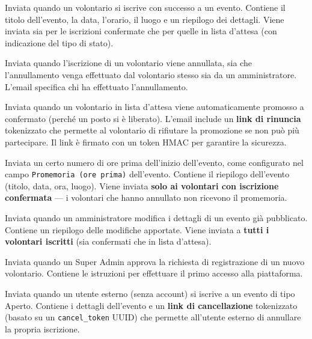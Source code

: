 \documentclass[a4paper,11pt,oneside]{book}
\newcommand{\campo}[1]{\texttt{#1}}
\begin{document}
\begin{description}[leftmargin=1.5em, style=nextline]
  \item[Conferma iscrizione] Inviata quando un volontario si iscrive con successo a un evento. Contiene il titolo dell'evento, la data, l'orario, il luogo e un riepilogo dei dettagli. Viene inviata sia per le iscrizioni confermate che per quelle in lista d'attesa (con indicazione del tipo di stato).

  \item[Iscrizione annullata] Inviata quando l'iscrizione di un volontario viene annullata, sia che l'annullamento venga effettuato dal volontario stesso sia da un amministratore. L'email specifica chi ha effettuato l'annullamento.

  \item[Promozione dalla lista d'attesa] Inviata quando un volontario in lista d'attesa viene automaticamente promosso a confermato (perch\'e un posto si \`e liberato). L'email include un \textbf{link di rinuncia} tokenizzato che permette al volontario di rifiutare la promozione se non pu\`o pi\`u partecipare. Il link \`e firmato con un token HMAC per garantire la sicurezza.

  \item[Promemoria evento] Inviata un certo numero di ore prima dell'inizio dell'evento, come configurato nel campo \campo{Promemoria (ore prima)} dell'evento. Contiene il riepilogo dell'evento (titolo, data, ora, luogo). Viene inviata \textbf{solo ai volontari con iscrizione confermata} --- i volontari che hanno annullato non ricevono il promemoria.

  \item[Evento modificato] Inviata quando un amministratore modifica i dettagli di un evento gi\`a pubblicato. Contiene un riepilogo delle modifiche apportate. Viene inviata a \textbf{tutti i volontari iscritti} (sia confermati che in lista d'attesa).

  \item[Account approvato] Inviata quando un Super Admin approva la richiesta di registrazione di un nuovo volontario. Contiene le istruzioni per effettuare il primo accesso alla piattaforma.

  \item[Conferma iscrizione esterna] Inviata quando un utente esterno (senza account) si iscrive a un evento di tipo Aperto. Contiene i dettagli dell'evento e un \textbf{link di cancellazione} tokenizzato (basato su un \texttt{cancel\_token} UUID) che permette all'utente esterno di annullare la propria iscrizione.
\end{description}
\end{document}
